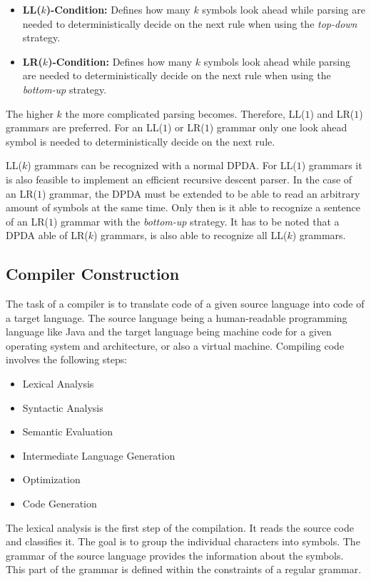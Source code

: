 \begin{itemize}
    \item \textbf{LL($k$)-Condition:} Defines how many $k$ symbols look ahead while parsing are needed to deterministically decide on the next rule when using the \textit{top-down} strategy.
    \item \textbf{LR($k$)-Condition:} Defines how many $k$ symbols look ahead while parsing are needed to deterministically decide on the next rule when using the \textit{bottom-up} strategy.
\end{itemize}

The higher $k$ the more complicated parsing becomes. Therefore, LL($1$) and LR($1$) grammars are preferred. For an LL($1$) or LR($1$) grammar only one look ahead symbol is needed to deterministically decide on the next rule. 

LL($k$) grammars can be recognized with a normal DPDA. For LL($1$) grammars it is also feasible to implement an efficient recursive descent parser. In the case of an LR($1$) grammar, the DPDA must be extended to be able to read an arbitrary amount of symbols at the same time. Only then is it able to recognize a sentence of an LR($1$) grammar with the \textit{bottom-up} strategy. It has to be noted that a DPDA able of LR($k$) grammars, is also able to recognize all LL($k$) grammars.

\subsection{Compiler Construction}

The task of a compiler is to translate code of a given source language into code of a target language. The source language being a human-readable programming language like Java and the target language being machine code for a given operating system and architecture, or also a virtual machine. Compiling code involves the following steps: 
  
\begin{itemize}
    \item Lexical Analysis
    \item Syntactic Analysis
    \item Semantic Evaluation
    \item Intermediate Language Generation
    \item Optimization
    \item Code Generation
\end{itemize}


The lexical analysis is the first step of the compilation. It reads the source code and classifies it. The goal is to group the individual characters into symbols. The grammar of the source language provides the information about the symbols. This part of the grammar is defined within the constraints of a regular grammar. 

